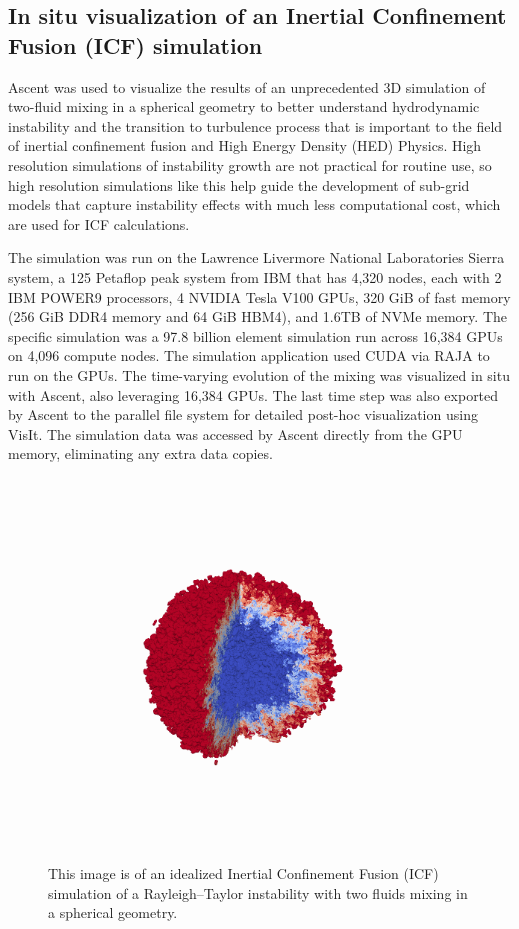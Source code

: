 \subsection{In situ visualization of an Inertial Confinement Fusion (ICF) simulation}

Ascent was used to visualize the results of an unprecedented 3D simulation
of two-fluid mixing in a spherical geometry to better understand hydrodynamic
instability and the transition to turbulence process that is important to
the field of inertial confinement fusion and High Energy Density (HED)
Physics. High resolution simulations of instability growth are not practical
for routine use, so high resolution simulations like this help guide the
development of sub-grid models that capture instability effects with much
less computational cost, which are used for ICF calculations.

The simulation was run on the Lawrence Livermore National Laboratories
Sierra system, a 125 Petaflop peak system from IBM that has 4,320 nodes,
each with 2 IBM POWER9 processors, 4 NVIDIA Tesla V100 GPUs, 320 GiB of
fast memory (256 GiB DDR4 memory and 64 GiB HBM4), and 1.6TB of NVMe
memory. The specific simulation was a 97.8 billion element simulation
run across 16,384 GPUs on 4,096 compute nodes. The simulation application
used CUDA via RAJA to run on the GPUs. The time-varying evolution of the
mixing was visualized in situ with Ascent, also leveraging 16,384 GPUs.
The last time step was also exported by Ascent to the parallel file
system for detailed post-hoc visualization using VisIt. The simulation
data was accessed by Ascent directly from the GPU memory, eliminating any
extra data copies.

\begin{figure}
\centering
\includegraphics[trim={ 0 8cm 0 7cm},width=0.9\textwidth]{images/mixing_ball}
\caption{\label{img:icf}
This image is of an idealized Inertial Confinement
Fusion (ICF) simulation of a Rayleigh–Taylor instability
with two fluids mixing in a spherical geometry.
}
\end{figure}
